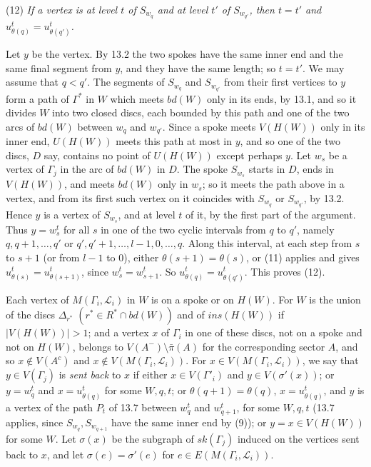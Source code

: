 {\hspace*{12pt}(12) \textit{If a vertex is at level $t$ of $S_{w_q}$ and at level $t'$ of $S_{w_{q'}}$, then $t = t'$ and $u_{\theta(q)}^t = u_{\theta(q')}^t$.}

Let $y$ be the vertex. By 13.2 the two spokes have the same inner end and the same final segment from $y$, and they have the same length; so $t = t'$. We may assume that $q < q'$. The segments of $S_{w_q}$ and $S_{w_{q'}}$ from their first vertices to $y$ form a path of $\Gamma^*$ in $W$ which meets $bd(W)$ only in its ends, by 13.1, and so it divides $W$ into two closed discs, each bounded by this path and one of the two arcs of $bd(W)$ between $w_q$ and $w_{q'}$. Since a spoke meets $V(H(W))$ only in its inner end, $U(H(W))$ meets this path at most in $y$, and so one of the two discs, $D$ say, contains no point of $U(H(W))$ except perhaps $y$. Let $w_s$ be a vertex of $\Gamma_j$ in the arc of $bd(W)$ in $D$. The spoke $S_{w_s}$ starts in $D$, ends in $V(H(W))$, and meets $bd(W)$ only in $w_s$; so it meets the path above in a vertex, and from its first such vertex on it coincides with $S_{w_q}$ or $S_{w_{q'}}$, by 13.2. Hence $y$ is a vertex of $S_{w_s}$, and at level $t$ of it, by the first part of the argument. Thus $y = w_s^t$ for all $s$ in one of the two cyclic intervals from $q$ to $q'$, namely $q, q+1, \dots, q'$ or $q', q'+1, \dots, l-1, 0, \dots, q$. Along this interval, at each step from $s$ to $s+1$ (or from $l-1$ to $0$), either $\theta(s+1) = \theta(s)$, or (11) applies and gives $u^t_{\theta(s)} = u^t_{\theta(s+1)}$, since $w_s^t = w_{s+1}^t$. So $u_{\theta(q)}^t = u_{\theta(q')}^t$. This proves (12).

Each vertex of $M(\Gamma_i, \mathscr{L}_i)$ in $W$ is on a spoke or on $H(W)$. For $W$ is the union of the discs $\Delta_{r^*}$ $(r^* \in R^* \cap bd(W))$ and of $ins(H(W))$ if $|V(H(W))| > 1$; and a vertex $x$ of $\Gamma_i$ in one of these discs, not on a spoke and not on $H(W)$, belongs to $V(A^-) \setminus \bar{\pi}(A)$ for the corresponding sector $A$, and so $x \notin V(A^c)$ and $x \notin V(M(\Gamma_i, \mathscr{L}_i))$. For $x \in V(M(\Gamma_i, \mathscr{L}_i))$, we say that $y \in V(\Gamma_j)$ is \textit{sent back} to $x$ if either $x \in V(\Gamma'_i)$ and $y \in V(\sigma'(x))$; or $y = w_q^t$ and $x = u_{\theta(q)}^t$ for some $W, q, t$; or $\theta(q+1) = \theta(q)$, $x = u_{\theta(q)}^t$, and $y$ is a vertex of the path $P_t$ of 13.7 between $w_q^t$ and $w_{q+1}^t$, for some $W, q, t$ (13.7 applies, since $S_{w_q}, S_{w_{q+1}}$ have the same inner end by (9)); or $y = x \in V(H(W))$ for some $W$. Let $\sigma(x)$ be the subgraph of $sk(\Gamma_j)$ induced on the vertices sent back to $x$, and let $\sigma(e) = \sigma'(e)$ for $e \in E(M(\Gamma_i, \mathscr{L}_i))$.

}
